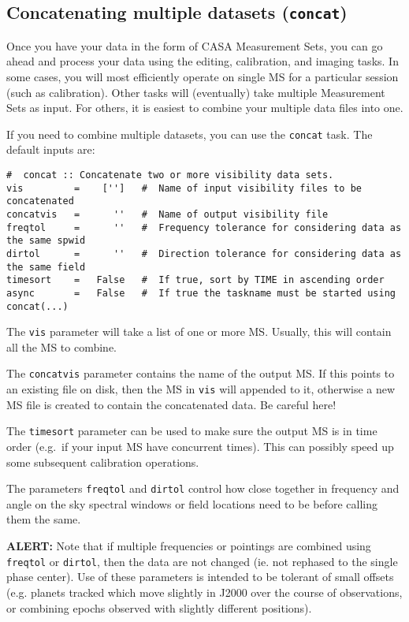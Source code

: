 \subsection{Concatenating multiple datasets ({\tt concat})}
\label{section:io.concat}

Once you have your data in the form of CASA Measurement Sets, you
can go ahead and process your data using the editing, calibration,
and imaging tasks.  In some cases, you will most efficiently operate
on single MS for a particular session (such as calibration).  Other
tasks will (eventually) take multiple Measurement Sets as input.  For others,
it is easiest to combine your multiple data files into one.

If you need to combine multiple datasets, you can use the {\tt concat} task.
The default inputs are:
\small
\begin{verbatim}
#  concat :: Concatenate two or more visibility data sets.
vis         =    ['']   #  Name of input visibility files to be concatenated
concatvis   =      ''   #  Name of output visibility file
freqtol     =      ''   #  Frequency tolerance for considering data as the same spwid
dirtol      =      ''   #  Direction tolerance for considering data as the same field
timesort    =   False   #  If true, sort by TIME in ascending order
async       =   False   #  If true the taskname must be started using concat(...)
\end{verbatim}
\normalsize

The {\tt vis} parameter will take a list of one or more MS.  Usually,
this will contain all the MS to combine.

The {\tt concatvis} parameter contains the name of the output MS.
If this points to an existing file on disk, then the MS in
{\tt vis} will appended to it,  otherwise a new MS file
is created to contain the concatenated data.  Be careful here!

The {\tt timesort} parameter can be used to make sure the output
MS is in time order (e.g.\ if your input MS have concurrent times).
This can possibly speed up some subsequent calibration operations.

The parameters {\tt freqtol} and {\tt dirtol} control how close
together in frequency and angle on the sky spectral windows or field
locations need to be before calling them the same.

{\bf ALERT:} Note that if multiple frequencies or pointings are
combined using {\tt freqtol} or {\tt dirtol}, then the data are not
changed (ie. not rephased to the single phase center).  Use of these 
parameters is intended to be tolerant of small offsets (e.g. planets
tracked which move slightly in J2000 over the course of observations,
or combining epochs observed with slightly different positions).

